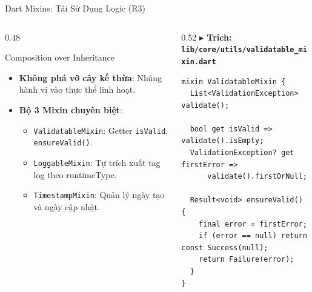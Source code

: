 \documentclass[aspectratio=169, 10pt]{beamer}
\newcommand{\speakerA}{\hfill\tcbox[colback=IndigoAccent,colframe=IndigoAccent,boxsep=1pt,left=3pt,right=3pt,top=1pt,bottom=1pt]{\tiny\bfseries\color{white}SV A: Nguyễn Đức Hải}}
\begin{document}
\begin{frame}[fragile]{Dart Mixins: Tái Sử Dụng Logic (R3) \speakerA}
  \begin{columns}[c]
    \begin{column}{0.48\textwidth}
      \begin{infobox}[IndigoAccent]{Composition over Inheritance}
        \begin{itemize}\setlength{\itemsep}{3pt}\scriptsize
          \item \textbf{Không phá vỡ cây kế thừa}: Nhúng hành vi vào thực thể linh hoạt.
          \item \textbf{Bộ 3 Mixin chuyên biệt}:
          \begin{itemize}\scriptsize
            \item \texttt{ValidatableMixin}: Getter \texttt{isValid}, \texttt{ensureValid()}.
            \item \texttt{LoggableMixin}: Tự trích xuất tag log theo runtimeType.
            \item \texttt{TimestampMixin}: Quản lý ngày tạo và ngày cập nhật.
          \end{itemize}
        \end{itemize}
      \end{infobox}
    \end{column}

    \begin{column}{0.52\textwidth}
\vspace{1mm}
{\scriptsize\bfseries\color{NavyPrimary} $\blacktriangleright$ Trích: \texttt{lib/core/utils/validatable_mixin.dart}}\\[1mm]
\begin{lstlisting}
mixin ValidatableMixin {
  List<ValidationException> validate();

  bool get isValid => validate().isEmpty;
  ValidationException? get firstError => 
      validate().firstOrNull;

  Result<void> ensureValid() {
    final error = firstError;
    if (error == null) return const Success(null);
    return Failure(error);
  }
}
\end{lstlisting}
    \end{column}
  \end{columns}
\end{frame}
\end{document}
